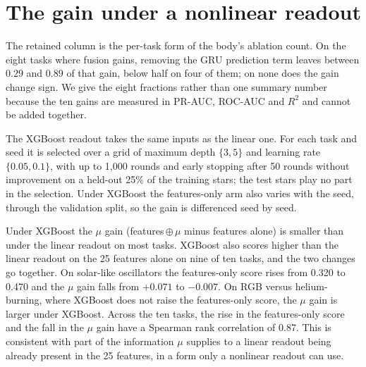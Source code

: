 \documentclass{article}
\begin{document}
\section{The gain under a nonlinear readout}
\label{app:readout}

\begin{table}[H]
\caption{What 128 added columns change, relative to the 25 features alone, under each frozen readout
(mean over six encoder seeds; absolute scores are in Table~\ref{tab:scorecard}). $+\mu$: our encoder.
No prediction term: the same recipe trained without the GRU prediction term. Retained: the share of
the full $\mu$ gain that survives that removal, printed only where the full gain is a gain, and
negative where the gain changes sign rather than shrinking. Untrained: a randomly
initialised encoder, which is a single encoder and carries no band. Bold: beyond $2\,\mathrm{SE}$ ---
unlike Table~\ref{tab:scorecard}, where bold marks the best point estimate and implies no test. The
last row counts tasks won, tied and lost at that bar.}
\label{tab:readout}
\centering
\scriptsize

\end{table}

The retained column is the per-task form of the body's ablation count. On the eight tasks where
fusion gains, removing the GRU prediction term leaves between $0.29$ and $0.89$ of that gain, below
half on four of them; on none does the gain change sign. We give the eight fractions rather
than one summary number because the ten gains are measured in PR-AUC, ROC-AUC and $R^{2}$ and cannot
be added together.

The XGBoost readout takes the same inputs as the linear one. For each task and seed it is selected
over a grid of maximum depth $\{3,5\}$ and learning rate $\{0.05,0.1\}$, with up to 1{,}000 rounds
and early stopping after 50 rounds without improvement on a held-out 25\% of the training stars;
the test stars play no part in the selection. Under XGBoost the features-only arm also varies with
the seed, through the validation split, so the gain is differenced seed by seed.

Under XGBoost the $\mu$ gain (features\,$\oplus\,\mu$ minus features alone) is smaller than under the
linear readout on most tasks. XGBoost also scores higher than the linear readout on the 25 features
alone on nine of ten tasks, and the two changes go together. On solar-like oscillators the features-only score rises from
0.320 to 0.470 and the $\mu$ gain falls from $+0.071$ to $-0.007$. On RGB versus helium-burning,
where XGBoost does not raise the features-only score, the $\mu$ gain is larger under XGBoost. Across
the ten tasks, the rise in the features-only score and the fall in the $\mu$ gain have a Spearman rank
correlation of 0.87. This is consistent with part of the information $\mu$ supplies to a linear
readout being already present in the 25 features, in a form only a nonlinear readout can use.
\end{document}
